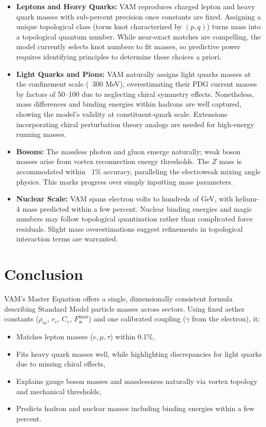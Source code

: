 \documentclass[11pt]{article}
\begin{document}
\begin{itemize}
    \item \textbf{Leptons and Heavy Quarks:} VAM reproduces charged lepton and heavy quark masses with sub-percent precision once constants are fixed. Assigning a unique topological class (torus knot characterized by $(p,q)$) turns mass into a topological quantum number. While near-exact matches are compelling, the model currently selects knot numbers to fit masses, so predictive power requires identifying principles to determine these choices a priori.

    \item \textbf{Light Quarks and Pions:} VAM naturally assigns light quarks masses at the confinement scale (~300 MeV), overestimating their PDG current masses by factors of 50–100 due to neglecting chiral symmetry effects. Nonetheless, mass differences and binding energies within hadrons are well captured, showing the model’s validity at constituent-quark scale. Extensions incorporating chiral perturbation theory analogs are needed for high-energy running masses.

    \item \textbf{Bosons:} The massless photon and gluon emerge naturally; weak boson masses arise from vortex reconnection energy thresholds. The $Z$ mass is accommodated within ~1\% accuracy, paralleling the electroweak mixing angle physics. This marks progress over simply inputting mass parameters.

    \item \textbf{Nuclear Scale:} VAM spans electron volts to hundreds of GeV, with helium-4 mass predicted within a few percent. Nuclear binding energies and magic numbers may follow topological quantization rather than complicated force residuals. Slight mass overestimations suggest refinements in topological interaction terms are warranted.
\end{itemize}

\section{Conclusion}

VAM’s Master Equation offers a single, dimensionally consistent formula describing Standard Model particle masses across sectors. Using fixed aether constants ($\rho_{\scriptscriptstyle\boldsymbol\!m}$, $r_c$, $C_e$, $F^{\max}_{\text{\ae}}$) and one calibrated coupling ($\gamma$ from the electron), it:

\begin{itemize}
    \item Matches lepton masses ($e, \mu, \tau$) within 0.1\%,
    \item Fits heavy quark masses well, while highlighting discrepancies for light quarks due to missing chiral effects,
    \item Explains gauge boson masses and masslessness naturally via vortex topology and mechanical thresholds,
    \item Predicts hadron and nuclear masses including binding energies within a few percent.
\end{itemize}
\end{document}
